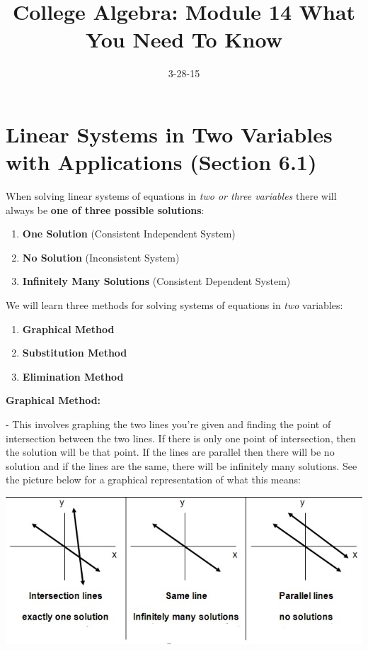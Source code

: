 \documentclass[12pt]{article}
\begin{document}
\title{College Algebra: Module 14 What You Need To Know}
\date{3-28-15}
\author{}
\maketitle

\section{Linear Systems in Two Variables with Applications (Section 6.1)}

When solving linear systems of equations in \textit{two or three variables} there will always be \textbf{one of three possible solutions}:

\begin{enumerate}

\item \textbf{One Solution} (Consistent Independent System)
\item \textbf{No Solution} (Inconsistent System)
\item \textbf{Infinitely Many Solutions} (Consistent Dependent System)

\end{enumerate}

\vspace{1cm}

We will learn three methods for solving systems of equations in \textit{two} variables:


\begin{enumerate}
\item \textbf{Graphical Method}
\item \textbf{Substitution Method}
\item \textbf{Elimination Method}
\end{enumerate}

\vspace{.5cm}

\textbf{Graphical Method:}

- This involves graphing the two lines you're given and finding the point of intersection between the two lines. If there is only one point of intersection, then the solution will be that point. If the lines are parallel then there will be no solution and if the lines are the same, there will be infinitely many solutions. See the picture below for a graphical representation of what this means:

\centerline{\includegraphics{LinearSystemSoln.jpg}}
\end{document}
